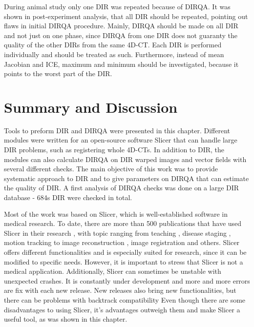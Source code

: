 \documentclass[type=dr, dr=rernat, accentcolor=tud7b,colorbacktitle, bigchapter, openright, twoside, 12pt ]{tudthesis}
\begin{document}
During animal study only one DIR was repeated because of DIRQA. It was shown in post-experiment analysis, that all DIR should be repeated, pointing out flaws in initial DIRQA procedure.
Mainly, DIRQA should be made on all DIR and not just on one phase, since DIRQA from one DIR does not guaranty the quality of the other DIRs from the same 4D-CT. 
Each DIR is performed individually and should be treated as such. Furthermore, instead of mean Jacobian and ICE, maximum and minimum should be investigated, 
because it points to the worst part of the DIR.





\section{Summary and Discussion}
\label{Summary}

Tools to preform DIR and DIRQA were presented in this chapter. Different modules were written for an open-source software Slicer that can handle large DIR problems, such as registering whole 4D-CTs. 
In addition to DIR, the modules can also calculate DIRQA on DIR warped images and vector fields with several different checks.
The main objective of this work was to provide systematic approach to DIR and to give parameters on DIRQA that can estimate the quality of DIR. A first analysis of DIRQA checks was done on a large DIR database - 684s DIR were checked in total.

Most of the work was based on Slicer, which is well-established software in medical research. To date, there are more than 500 publications that have used Slicer in their research \cite{SlicerCitation}, with topic ranging from 
teaching \cite{Pujol2016}, disease staging \cite{Liu2015, Liu2016b}, motion tracking \cite{Behringer2015} to image reconstruction \cite{Meyer2015}, image registration \cite{Li2015, Fedorov2015, Li2015b}
and others. Slicer offers different functionalities and is especially suited for research, since it can be modified to specific needs. However, it is important to stress that Slicer 
is not a medical application. Additionally, Slicer can sometimes be unstable with unexpected crashes. It is constantly under development and more and more errors
are fix with each new release. New releases also bring new functionalities, but there can be problems with backtrack compatibility Even though there are some disadvantages to using Slicer, it's advantages
outweigh them and make Slicer a useful tool, as was shown in this chapter.
\end{document}
